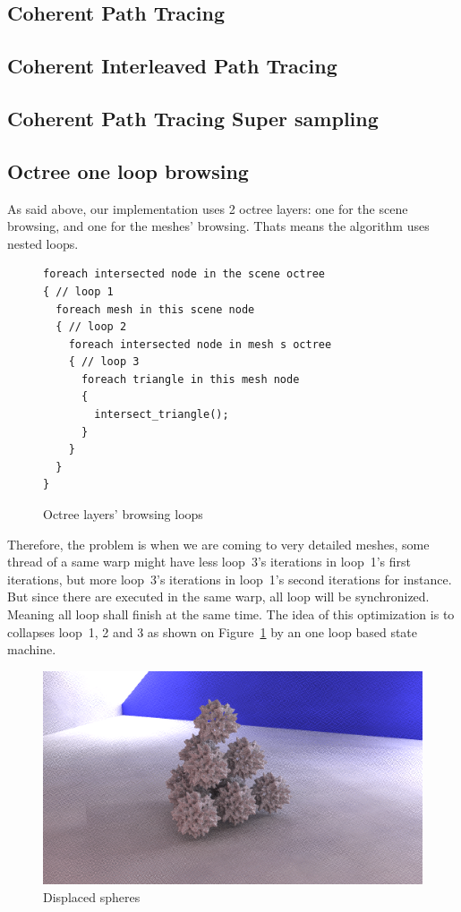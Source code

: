 \documentclass[10pt,twocolumn,a4paper]{article}
\begin{document}
\subsection{Coherent Path Tracing}
\subsection{Coherent Interleaved Path Tracing}
\subsection{Coherent Path Tracing Super sampling}
\subsection{Octree one loop browsing}
As said above, our implementation uses 2 octree layers: one for the scene browsing,
and one for the meshes' browsing. Thats means the algorithm uses nested loops.
\begin{figure}[H]
    \centering
    \begin{lstlisting}[morekeywords={foreach}]
foreach intersected node in the scene octree
{ // loop 1
  foreach mesh in this scene node
  { // loop 2
    foreach intersected node in mesh s octree
    { // loop 3
      foreach triangle in this mesh node
      {
        intersect_triangle();
      }
    }
  }
}
    \end{lstlisting}
    \caption{Octree layers' browsing loops}
    \label{code:octree_layers_loops}
\end{figure}

Therefore, the problem is when we are coming to very detailed meshes, some thread
of a same warp might have less loop~3's iterations in loop~1's first iterations,
but more loop~3's iterations in loop~1's second iterations for instance. But since
there are executed in the same warp, all loop will be synchronized. Meaning all
loop shall finish at the same time. The idea of this optimization
is to collapses loop~1, 2 and 3 as shown on Figure~\ref{code:octree_layers_loops}
by an one loop based state machine.

\begin{figure}[h]
    \centering
    \includegraphics[width=0.8\columnwidth]{render_displaced_spheres.png}
    \caption{Displaced spheres}
    \label{fig:displaced_spheres}
\end{figure}
\end{document}
